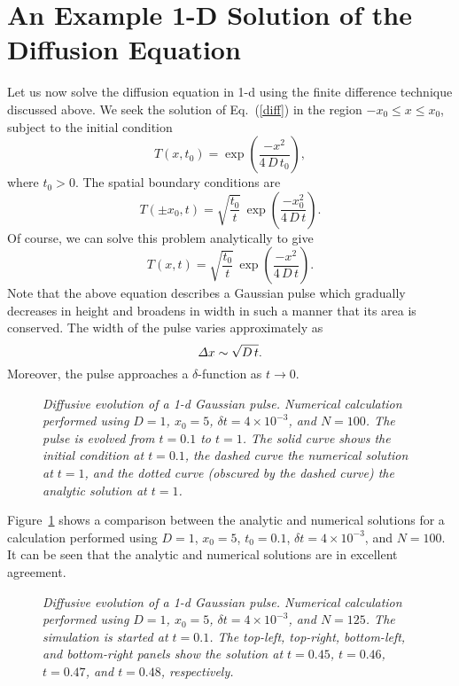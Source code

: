 \section{An Example 1-D Solution of the Diffusion Equation}\label{simple}
Let us now solve the diffusion equation in 1-d using the finite difference
technique discussed above. We seek the solution of Eq.~(\ref{diff})
in the region $-x_0 \leq x \leq x_0$, subject to the initial
condition
\begin{equation}
T(x,t_0) = \exp\!\left(\frac{-x^2}{4\,D\,t_0}\right),
\end{equation}
where $t_0>0$. The spatial boundary conditions are
\begin{equation}
 T(\pm x_0,t) = \sqrt{\frac{t_0}{t}}\, \exp\!\left(\frac{-x_0^2}{4\,D\,t}\right).
\end{equation}
 Of course, we can solve this problem
analytically to give
\begin{equation}
T(x,t) =\sqrt{\frac{t_0}{t}}\, \exp\!\left(\frac{-x^2}{4\,D\,t}\right).
\end{equation}
Note that the above equation describes a Gaussian 
 pulse which gradually decreases in height
and broadens in width in such a manner that its area is conserved. The width of the pulse
varies approximately as
\begin{equation}
{\mit\Delta}x \sim \sqrt{D\,t}.
\end{equation}
Moreover, the pulse approaches a $\delta$-function as $t\rightarrow 0$. 

\begin{figure}
\epsfysize=3in
\centerline{}
\caption{\em Diffusive evolution of a 1-d Gaussian pulse.
Numerical  calculation performed using
$D=1$, $x_0=5$, $\delta t = 4\times 10^{-3}$, and $N=100$. The pulse is evolved from $t=0.1$ to $t=1$. The
solid curve shows the initial condition at $t=0.1$, the dashed curve  the numerical solution
at $t=1$, and the dotted curve (obscured by the dashed curve)  the analytic solution at $t=1$. }\label{fdiff1}
\end{figure}

Figure~\ref{fdiff1} shows a comparison between the analytic and numerical solutions for
a calculation performed using $D=1$, $x_0=5$,  $t_0=0.1$, $\delta t = 4\times 10^{-3}$, and $N=100$.
It can be seen that the  analytic and numerical solutions are in excellent agreement.

\begin{figure}
\epsfysize=4in
\centerline{}
\caption{\em  Diffusive evolution of a 1-d Gaussian pulse.
Numerical  calculation performed using
$D=1$, $x_0=5$,  $\delta t = 4\times 10^{-3}$, and $N=125$. The simulation is started
at $t=0.1$. The top-left, top-right, bottom-left, and bottom-right panels
show the solution at $t=0.45$, $t=0.46$, $t=0.47$, and $t=0.48$, respectively.}\label{fdiff2}
\end{figure}

